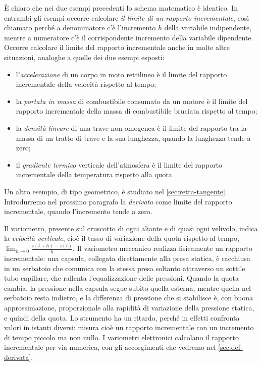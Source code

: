 È chiaro che nei due esempi precedenti lo schema matematico è identico. In entrambi gli
esempi occorre calcolare \emph{il limite di un rapporto incrementale}, così chiamato
perché a denominatore c'è l'incremento $h$ della variabile indipendente, mentre a
numeratore c'è il corrispondente incremento della variabile dipendente. Occorre
calcolare il limite del rapporto incrementale anche in molte altre situazioni, analoghe
a quelle dei due esempi esposti:
\begin{itemize}
  \item l'\emph{accelerazione} di un corpo in moto rettilineo è il limite del rapporto
  incrementale della velocità rispetto al tempo;
  \item la \emph{portata in massa} di combustibile consumato da un motore è il limite del
  rapporto incrementale della massa di combustibile bruciata rispetto al tempo;
  \item la \emph{densità lineare} di una trave non omogenea è il limite del rapporto tra
  la massa di un tratto di trave e la sua lunghezza, quando la lunghezza tende a zero;
  \item il \emph{gradiente termico} verticale dell'atmosfera è il limite del rapporto
  incrementale della temperatura rispetto alla quota.
\end{itemize}
Un altro esempio, di tipo geometrico, è studiato nel \cref{sec:retta-tangente}.
Introdurremo nel prossimo paragrafo la \emph{derivata} come limite del rapporto
incrementale, quando l'incremento tende a zero.

\begin{idea}
Il variometro, presente sul cruscotto di ogni aliante e di quasi ogni velivolo, indica
la \emph{velocità verticale}, cioè il tasso di variazione della quota rispetto al tempo,
$\lim_{h\to0}\frac{z(t+h)-z(t)}{h}$. Il variometro meccanico realizza fisicamente
un rapporto incrementale: una capsula, collegata direttamente alla presa statica, è
racchiusa in un serbatoio che comunica con la stessa presa soltanto attraverso un
sottile tubo capillare, che rallenta l'equalizzazione delle pressioni. Quando la quota
cambia, la pressione nella capsula segue subito quella esterna, mentre quella nel
serbatoio resta indietro, e la differenza di pressione che si stabilisce è, con buona
approssimazione, proporzionale alla rapidità di variazione della pressione statica, e
quindi della quota. Lo strumento ha un ritardo, perché in effetti confronta valori in
istanti diversi: misura cioè un rapporto incrementale con un incremento di tempo
piccolo ma non nullo. I variometri elettronici calcolano il rapporto incrementale per
via numerica, con gli accorgimenti che vedremo nel \cref{sec:def-derivata}.
\end{idea}


